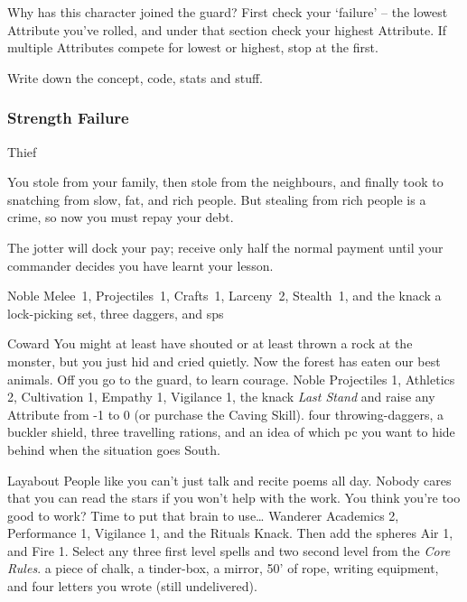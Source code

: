 \begin{multicols}{2}

\noindent
Why has this character joined the \gls{guard}?
First check your `failure' -- the lowest Attribute you've rolled, and under that section check your highest Attribute.
If multiple Attributes compete for lowest or highest, stop at the first.

Write down the concept, code, stats and stuff.

\subsubsection{Strength Failure}

\begin{itemize}

    {Thief}%
    {
      You stole from your family, then stole from the neighbours, and finally took to snatching from slow, fat, and rich people.
      But stealing from rich people is a crime, so now you must repay your debt.

      The \gls{jotter} will dock your pay; receive only half the normal payment until your commander decides you have learnt your lesson.

    }%
    {Noble}%
    {Melee~1, Projectiles~1, Crafts~1, Larceny~2, Stealth~1, and the knack }%
    {a lock-picking set, three daggers, and  \glspl{sp}}%

    {Coward}%
    {
      You might at least have shouted or at least thrown a rock at the \gls{monster}, but you just hid and cried quietly.
      Now the forest has eaten our best animals.
      Off you go to the \gls{guard}, to learn courage.
    }%
    {Noble}%
    {
      Projectiles 1, Athletics 2, Cultivation 1, Empathy 1, Vigilance 1, the knack \textit{Last Stand} and raise any Attribute from -1 to 0 (or purchase the Caving Skill).
    }%
    {
      four throwing-daggers, a buckler shield, three travelling \glspl{ration}, and an idea of which \gls{pc} you want to hide behind when the situation goes South.
    }%


    {Layabout}%
    {
      People like you can't just talk and recite poems all day.
      Nobody cares that you can read the stars if you won't help with the work.
      You think you're too good to work?
      Time to put that brain to use\ldots
    }%
    {Wanderer}%
    {%
      Academics 2, Performance 1, Vigilance 1, and the Rituals Knack.
    Then add the \glspl{sphere} Air 1, and Fire 1.
    Select any three first level spells and two second level from the \textit{Core Rules}\iftoggle{core}{, pages \pageref{fireSpells} and \pageref{lightSpells}}{}.
    }%
    {
      a piece of chalk, a tinder-box, a mirror, 50' of rope, writing equipment, and four letters you wrote (still undelivered).
    }%


\end{itemize}
\end{multicols}

